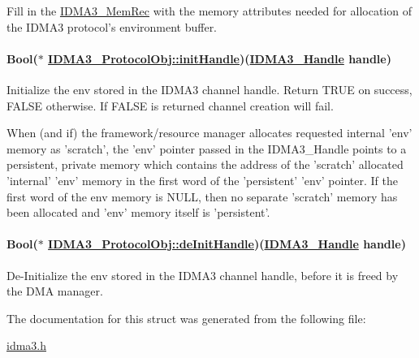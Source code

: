 Fill in the \hyperlink{struct_i_d_m_a3___mem_rec}{IDMA3\_\-Mem\-Rec} with the memory attributes needed for allocation of the IDMA3 protocol's environment buffer. \hypertarget{struct_i_d_m_a3___protocol_obj_147bfd9a69a93542195adcdea86a6a58}{
\paragraph[initHandle]{\setlength{\rightskip}{0pt plus 5cm}Bool($\ast$ \hyperlink{struct_i_d_m_a3___protocol_obj_147bfd9a69a93542195adcdea86a6a58}{IDMA3\_\-Protocol\-Obj::init\-Handle})(\hyperlink{struct_i_d_m_a3___obj}{IDMA3\_\-Handle} handle)}\hfill}
\label{struct_i_d_m_a3___protocol_obj_147bfd9a69a93542195adcdea86a6a58}


Initialize the env stored in the IDMA3 channel handle. Return TRUE on success, FALSE otherwise. If FALSE is returned channel creation will fail.

When (and if) the framework/resource manager allocates requested internal 'env' memory as 'scratch', the 'env' pointer passed in the IDMA3\_\-Handle points to a persistent, private memory which contains the address of the 'scratch' allocated 'internal' 'env' memory in the first word of the 'persistent' 'env' pointer. If the first word of the env memory is NULL, then no separate 'scratch' memory has been allocated and 'env' memory itself is 'persistent'. \hypertarget{struct_i_d_m_a3___protocol_obj_7ce1036a56ee66ca9d0a195c04e40518}{
\paragraph[deInitHandle]{\setlength{\rightskip}{0pt plus 5cm}Bool($\ast$ \hyperlink{struct_i_d_m_a3___protocol_obj_7ce1036a56ee66ca9d0a195c04e40518}{IDMA3\_\-Protocol\-Obj::de\-Init\-Handle})(\hyperlink{struct_i_d_m_a3___obj}{IDMA3\_\-Handle} handle)}\hfill}
\label{struct_i_d_m_a3___protocol_obj_7ce1036a56ee66ca9d0a195c04e40518}


De-Initialize the env stored in the IDMA3 channel handle, before it is freed by the DMA manager. 

The documentation for this struct was generated from the following file:\begin{CompactItemize}
\item 
\hyperlink{idma3_8h}{idma3.h}\end{CompactItemize}

